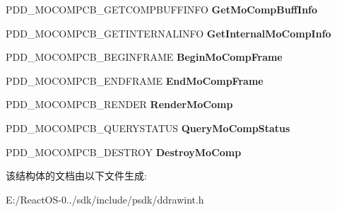 \begin{DoxyCompactItemize}
P\+D\+D\+\_\+\+M\+O\+C\+O\+M\+P\+C\+B\+\_\+\+G\+E\+T\+C\+O\+M\+P\+B\+U\+F\+F\+I\+N\+FO {\bfseries Get\+Mo\+Comp\+Buff\+Info}
\item 
\mbox{\label{struct_d_d___m_o_t_i_o_n_c_o_m_p_c_a_l_l_b_a_c_k_s_ab8fa785ca6df5672a8cf5c7debe5f16d}} 
P\+D\+D\+\_\+\+M\+O\+C\+O\+M\+P\+C\+B\+\_\+\+G\+E\+T\+I\+N\+T\+E\+R\+N\+A\+L\+I\+N\+FO {\bfseries Get\+Internal\+Mo\+Comp\+Info}
\item 
\mbox{\label{struct_d_d___m_o_t_i_o_n_c_o_m_p_c_a_l_l_b_a_c_k_s_a0095e75a6f77b8623d141cb28328608e}} 
P\+D\+D\+\_\+\+M\+O\+C\+O\+M\+P\+C\+B\+\_\+\+B\+E\+G\+I\+N\+F\+R\+A\+ME {\bfseries Begin\+Mo\+Comp\+Frame}
\item 
\mbox{\label{struct_d_d___m_o_t_i_o_n_c_o_m_p_c_a_l_l_b_a_c_k_s_a6cb7247810666d52c320f5d16125c458}} 
P\+D\+D\+\_\+\+M\+O\+C\+O\+M\+P\+C\+B\+\_\+\+E\+N\+D\+F\+R\+A\+ME {\bfseries End\+Mo\+Comp\+Frame}
\item 
\mbox{\label{struct_d_d___m_o_t_i_o_n_c_o_m_p_c_a_l_l_b_a_c_k_s_aafbac46e2a42264fc0ab1bbde4aa6e19}} 
P\+D\+D\+\_\+\+M\+O\+C\+O\+M\+P\+C\+B\+\_\+\+R\+E\+N\+D\+ER {\bfseries Render\+Mo\+Comp}
\item 
\mbox{\label{struct_d_d___m_o_t_i_o_n_c_o_m_p_c_a_l_l_b_a_c_k_s_a9d33c38e1723a8c644481598a9a152b7}} 
P\+D\+D\+\_\+\+M\+O\+C\+O\+M\+P\+C\+B\+\_\+\+Q\+U\+E\+R\+Y\+S\+T\+A\+T\+US {\bfseries Query\+Mo\+Comp\+Status}
\item 
\mbox{\label{struct_d_d___m_o_t_i_o_n_c_o_m_p_c_a_l_l_b_a_c_k_s_abab717b8291ac5c0bab59bea053ee813}} 
P\+D\+D\+\_\+\+M\+O\+C\+O\+M\+P\+C\+B\+\_\+\+D\+E\+S\+T\+R\+OY {\bfseries Destroy\+Mo\+Comp}
\end{DoxyCompactItemize}


该结构体的文档由以下文件生成\+:\begin{DoxyCompactItemize}
\item 
E\+:/\+React\+O\+S-\/0../sdk/include/psdk/ddrawint.\+h\end{DoxyCompactItemize}
